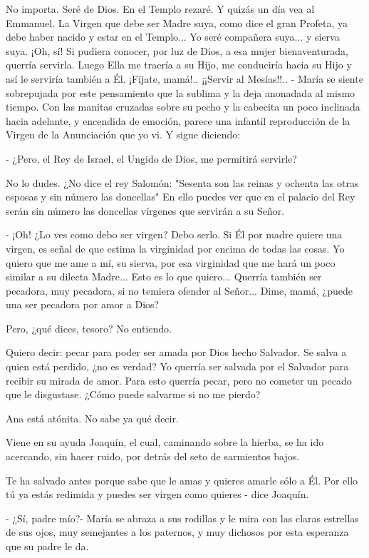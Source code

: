 \documentclass[12pt, twoside, openright]{book} %
\begin{document}
No importa. Seré de Dios. En el Templo rezaré. Y quizás un día vea al Emmanuel. La Virgen que debe ser Madre suya, como dice el gran Profeta, ya debe haber nacido y estar en el Templo... Yo seré compañera suya... y sierva suya. ¡Oh, sí! Si pudiera conocer, por luz de Dios, a esa mujer bienaventurada, querría servirla. Luego Ella me traería a su Hijo, me conduciría hacia su Hijo y así le serviría también a Él. ¡Fíjate, mamá!.. ¡¡Servir al Mesías!!.. - María se siente sobrepujada por este pensamiento que la sublima y la deja anonadada al mismo tiempo. Con las manitas cruzadas sobre su pecho y la cabecita un poco inclinada hacia adelante, y encendida de emoción, parece una infantil reproducción de la Virgen de la Anunciación que yo vi. Y sigue diciendo: 

- ¿Pero, el Rey de Israel, el Ungido de Dios, me permitirá servirle? 

No lo dudes. ¿No dice el rey Salomón: "Sesenta son las reinas y ochenta las otras esposas y sin número las doncellas" En ello puedes ver que en el palacio del Rey serán sin número las doncellas vírgenes que servirán a su Señor. 

- ¡Oh! ¿Lo ves como debo ser virgen? Debo serlo. Si Él por madre quiere una virgen, es señal de que estima la virginidad por encima de todas las cosas. Yo quiero que me ame a mí, su sierva, por esa virginidad que me hará un poco similar a su dilecta Madre... Esto es lo que quiero... Querría también ser pecadora, muy pecadora, si no temiera ofender al Señor... Dime, mamá, ¿puede una ser pecadora por amor a Dios? 

Pero, ¿qué dices, tesoro? No entiendo. 

Quiero decir: pecar para poder ser amada por Dios hecho Salvador. Se salva a quien está perdido, ¿no es verdad? Yo querría ser salvada por el Salvador para recibir su mirada de amor. Para esto querría pecar, pero no cometer un pecado que le disgustase. ¿Cómo puede salvarme si no me pierdo? 

Ana está atónita. No sabe ya qué decir. 

Viene en su ayuda Joaquín, el cual, caminando sobre la hierba, se ha ido acercando, sin hacer ruido, por detrás del seto de sarmientos bajos. 

Te ha salvado antes porque sabe que le amas y quieres amarle sólo a Él. Por ello tú ya estás redimida y puedes ser virgen como quieres - dice Joaquín. 

- ¿Sí, padre mío?- María se abraza a sus rodillas y le mira con las claras estrellas de sus ojos, muy semejantes a los paternos, y muy dichosos por esta esperanza que su padre le da. 
\end{document}
